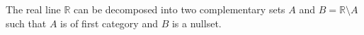 The real line $\mathbb{R}$ can be decomposed into two complementary sets $A$ and $B = \mathbb{R} \setminus A$ such that $A$ is of first category and $B$ is a nullset.
